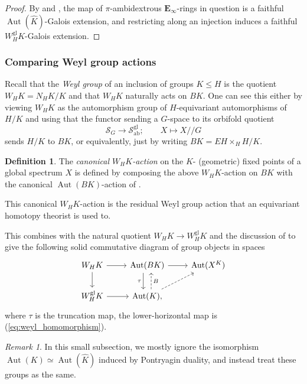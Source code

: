 \documentclass[11pt, a4paper]{article}
\newcommand{\ab}{\mathrm{ab}}
\newcommand{\gl}{\mathrm{gl}}
\newcommand{\1}{\mathbf{1}}
\newcommand{\Spc}{\mathcal{S}}
\DeclareMathOperator{\Aut}{Aut}
\newcommand{\dual}[1]{{\widehat{#1}}}
\newcommand{\E}{\mathbf{E}}
\theoremstyle{plain}
\theoremstyle{definition}
\newtheorem{mydef}[equation]{Definition}
\theoremstyle{remark}\numberwithin{equation}{section}
\newtheorem{remark}[equation]{Remark}
\begin{document}
\begin{proof}
    By  and , the map of $\pi$-ambidextrous $\E_\infty$-rings in question is a faithful $\Aut(\dual{K})$-Galois extension, and restricting along an injection induces a faithful $W_H^\gl K$-Galois extension.
\end{proof}

\subsubsection{Comparing Weyl group actions}\label{ssec:action_comparison}
Recall that the \emph{Weyl group} of an inclusion of groups $K\leq H$ is the quotient $W_H K = N_H K / K$ and that $W_H K$ naturally acts on $BK$. One can see this either by viewing $W_H K$ as the automorphism group of $H$-equivariant automorphisms of $H/K$ and using that the functor sending a $G$-space to its orbifold quotient
\[\Spc_G \to \Spc^\gl_\ab; \qquad X \mapsto X//G\]
sends $H/K$ to $BK$, or equivalently, just by writing $BK = EH \times_H H/K$.

\begin{mydef}\label{df:canonical_weylaction}
    The \emph{canonical $W_H K$-action} on the $K$- (geometric) fixed points of a global spectrum $X$ is defined by composing the above $W_H K$-action on $BK$ with the canonical $\Aut(BK)$-action of .
\end{mydef}

This canonical $W_H K$-action is the residual Weyl group action that an equivariant homotopy theorist is used to.

This combines with the natural quotient $W_H K \to W_H^\gl K$ and the discussion of  to give the following solid commutative diagram of group objects in spaces
\[\begin{tikzcd}
    {W_H K}\ar[d]\ar[r] &   {\Aut(BK)}\ar[d, "\tau", swap, shift right = 2]\ar[r]  &   {\Aut(X^K)}    \\
    {W_H^\gl K}\ar[r] &   {\Aut(K),}\ar[ru, dashed]\ar[u, shift right = 2, "B", dashed, swap] &   
\end{tikzcd}\]
where $\tau$ is the truncation map, the lower-horizontal map is (\ref{eq:weyl_homomorphism}).

\begin{remark}
    In this small subsection, we mostly ignore the isomorphism $\Aut(K) \simeq \Aut(\dual{K})$ induced by Pontryagin duality, and instead treat these groups as the same.
\end{remark}
\end{document}
